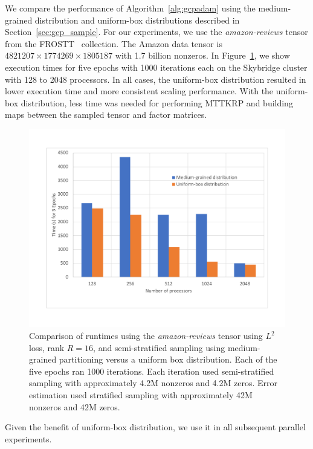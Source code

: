 We compare the performance of Algorithm~\ref{alg:gcpadam} using the 
medium-grained distribution and uniform-box distributions described in
Section~\ref{sec:gcp_sample}.  For our experiments, we use the \emph{amazon-reviews}
tensor from the 
FROSTT~\cite{FROSTT} collection.
The Amazon data tensor is $4821207\times 1774269\times 1805187 $ with 1.7 billion nonzeros.
In Figure~\ref{fig:amazon_medgrain_vs_uniformbox}, we show execution times 
for five epochs with 1000 iterations each on
the Skybridge cluster with 128 to 2048 processors.  In all cases, the 
uniform-box distribution resulted in lower execution time and more consistent
scaling performance.  With the uniform-box distribution, less time
was needed for performing MTTKRP and building maps between the sampled tensor and factor matrices.

\begin{figure}
\centering
\includegraphics[keepaspectratio=true, width=4.5in]{figs/amazon_medgrain_vs_uniformbox}
\caption[Runtime comparison with medium-grained and uniform-box distributions]{Comparison of runtimes using the \emph{amazon-reviews} tensor using $L^2$ loss, rank $R=16$, and semi-stratified sampling using medium-grained partitioning versus a uniform box distribution.  
Each of the five epochs ran 1000 iterations.  
Each iteration used semi-stratified sampling with approximately 4.2M nonzeros and 4.2M zeros. 
Error estimation used stratified sampling with approximately 42M nonzeros and 42M zeros. 
}
\label{fig:amazon_medgrain_vs_uniformbox}
\end{figure}

Given the benefit of uniform-box distribution, we use it in all subsequent 
parallel experiments.

